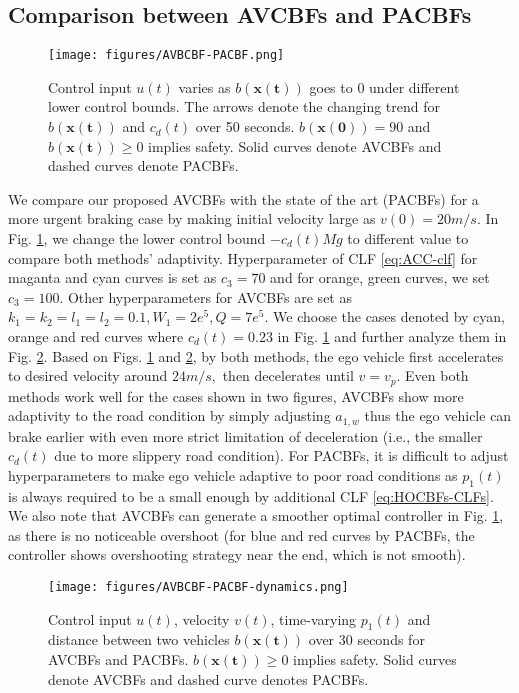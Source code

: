 \subsection{Comparison between AVCBFs and PACBFs}
\begin{figure}[ht]
    \centering
    \texttt{[image: figures/AVBCBF-PACBF.png]}
    \caption{Control input $u(t)$ varies as $b(\boldsymbol{x(t)})$ goes to 0 under different lower control bounds. The arrows denote the changing trend for $b(\boldsymbol{x(t)})$ and $c_{d}(t)$ over 50 seconds. $b(\boldsymbol{x(0)})=90$ and $b(\boldsymbol{x(t)})\ge 0$ implies safety. Solid curves denote AVCBFs and dashed curves denote PACBFs. }
    \label{fig:AVBCBFs-PACBFs-1}
\end{figure} 

We compare our proposed AVCBFs with the state of the art (PACBFs) for a more urgent braking case by making initial velocity large as $v(0)=20m/s.$ In Fig. \ref{fig:AVBCBFs-PACBFs-1}, we change the lower control bound $-c_{d}(t)Mg$ to different value to compare both methods' adaptivity. Hyperparameter of CLF \eqref{eq:ACC-clf} for maganta and cyan curves is set as $c_{3}=70$ and for orange, green curves, we set $c_{3}=100$. Other hyperparameters for AVCBFs are set as $k_{1}=k_{2}=l_{1}=l_{2}=0.1, W_{1}=2e^{5}, Q=7e^{5}.$ We choose the cases denoted by cyan, orange and red curves where $c_{d}(t)=0.23$ in Fig. \ref{fig:AVBCBFs-PACBFs-1} and further analyze them in Fig. \ref{fig:AVBCBFs-PACBFs-2}. Based on Figs. \ref{fig:AVBCBFs-PACBFs-1} and \ref{fig:AVBCBFs-PACBFs-2}, by both methods, the ego vehicle first accelerates to desired velocity around $24m/s,$ then decelerates until $v=v_{p}.$ Even both methods work well for the cases shown in two figures, AVCBFs show more adaptivity to the road condition by simply adjusting $a_{1,w}$ thus the ego vehicle can brake earlier with even more strict limitation of deceleration (i.e., the smaller $c_{d}(t)$ due to more slippery road condition). For PACBFs, it is difficult to adjust hyperparameters to make ego vehicle adaptive to poor road conditions as $p_{1}(t)$ is always required to be a small enough by additional CLF \eqref{eq:HOCBFs-CLFs}. We also note that AVCBFs can generate a smoother optimal controller in Fig. \ref{fig:AVBCBFs-PACBFs-1}, as there is no noticeable overshoot (for blue and red curves by PACBFs, the controller shows overshooting strategy near the end, which is not smooth).
\begin{figure}[ht]
    \centering
    \texttt{[image: figures/AVBCBF-PACBF-dynamics.png]}
    \caption{Control input $u(t)$, velocity $v(t)$, time-varying $p_{1}(t)$ and distance between two vehicles $b(\boldsymbol{x(t)})$ over 30 seconds for AVCBFs and PACBFs. $b(\boldsymbol{x(t)})\ge 0$ implies safety. Solid curves denote AVCBFs and dashed curve denotes PACBFs.}
    \label{fig:AVBCBFs-PACBFs-2}
\end{figure} 

